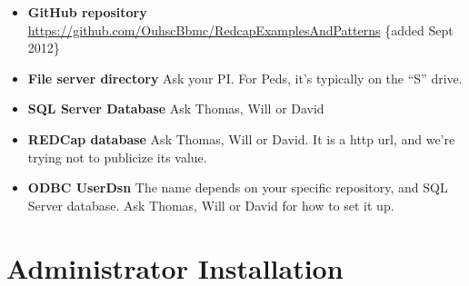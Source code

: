 \documentclass[
]{book}
\begin{document}
\begin{itemize}
\item
  \textbf{GitHub repository} \url{https://github.com/OuhscBbmc/RedcapExamplesAndPatterns} \{added Sept 2012\}
\item
  \textbf{File server directory} Ask your PI. For Peds, it's typically on the ``S'' drive.
\item
  \textbf{SQL Server Database} Ask Thomas, Will or David
\item
  \textbf{REDCap database} Ask Thomas, Will or David. It is a http url, and we're trying not to publicize its value.
\item
  \textbf{ODBC UserDsn} The name depends on your specific repository, and SQL Server database. Ask Thomas, Will or David for how to set it up.
\end{itemize}

\hypertarget{installation-administrator}{%
\section{Administrator Installation}\label{installation-administrator}}
\end{document}
